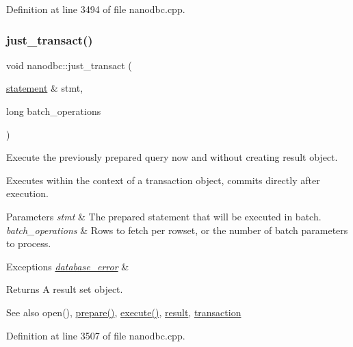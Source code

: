 Definition at line 3494 of file nanodbc.\+cpp.

\mbox{\label{group__mainf_ga343e69acce5e8122723ca8d38b0a7f92}} 
\subsubsection{\texorpdfstring{just\_transact()}{just\_transact()}}
{\footnotesize\ttfamily void nanodbc\+::just\+\_\+transact (\begin{DoxyParamCaption}\item[{\mbox{\hyperlink{classnanodbc_1_1statement}{statement}} \&}]{stmt,  }\item[{long}]{batch\+\_\+operations }\end{DoxyParamCaption})}



Execute the previously prepared query now and without creating result object. 

Executes within the context of a transaction object, commits directly after execution. 
\begin{DoxyParams}{Parameters}
{\em stmt} & The prepared statement that will be executed in batch. \\
\hline
{\em batch\+\_\+operations} & Rows to fetch per rowset, or the number of batch parameters to process. \\
\hline
\end{DoxyParams}

\begin{DoxyExceptions}{Exceptions}
{\em \mbox{\hyperlink{classnanodbc_1_1database__error}{database\+\_\+error}}} & \\
\hline
\end{DoxyExceptions}
\begin{DoxyReturn}{Returns}
A result set object. 
\end{DoxyReturn}
\begin{DoxySeeAlso}{See also}
open(), \mbox{\hyperlink{group__mainf_ga961a75629487f22ebc87d114c5699bc2}{prepare()}}, \mbox{\hyperlink{group__mainf_ga5cbac617a3964611bd16a2fc6f991b83}{execute()}}, \mbox{\hyperlink{classnanodbc_1_1result}{result}}, \mbox{\hyperlink{classnanodbc_1_1transaction}{transaction}} 
\end{DoxySeeAlso}


Definition at line 3507 of file nanodbc.\+cpp.

